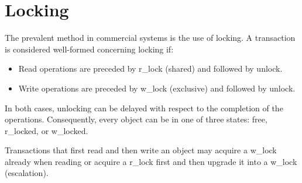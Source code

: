 \section{Locking}

The prevalent method in commercial systems is the use of locking. 
A transaction is considered well-formed concerning locking if:
\begin{itemize}
    \item Read operations are preceded by r\_lock (shared) and followed by unlock. 
    \item Write operations are preceded by w\_lock (exclusive) and followed by unlock. 
\end{itemize}
In both cases, unlocking can be delayed with respect to the completion of the operations. 
Consequently, every object can be in one of three states: free, r\_locked, or w\_locked.

Transactions that first read and then write an object may acquire a w\_lock already when reading or acquire a r\_lock first and then upgrade it into a w\_lock (escalation).

